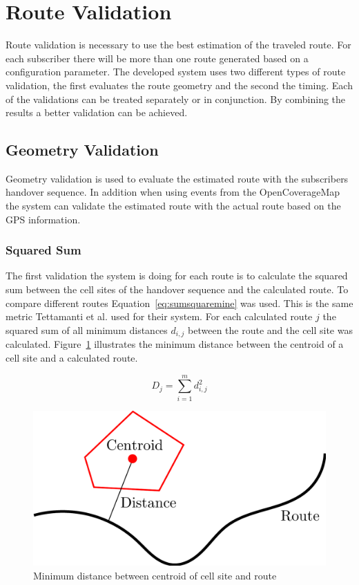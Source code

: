 \section{Route Validation}
\label{sec:routevalidation}
Route validation is necessary to use the best estimation of the traveled route. For each subscriber there will be more than one route generated based on a configuration parameter. The developed system uses two different types of route validation, the first evaluates the route geometry and the second the timing. Each of the validations can be treated separately or in conjunction. By combining the results a better validation can be achieved.
\subsection{Geometry Validation}
Geometry validation is used to evaluate the estimated route with the subscribers handover sequence. In addition when using events from the OpenCoverageMap the system can validate the estimated route with the actual route based on the GPS information.
\subsubsection{Squared Sum}
The first validation the system is doing for each route is to calculate the squared sum between the cell sites of the handover sequence and the calculated route. To compare different routes Equation~\ref{eq:sumsquaremine} was used. This is the same metric Tettamanti et al.\cite{Tettamanti2010} used for their system. For each calculated route $j$ the squared sum of all minimum distances $d_{i,j}$  between the route and the cell site was calculated. Figure~\ref{fig:rms} illustrates the minimum distance between the centroid of a cell site and a calculated route.

\begin{equation}
	\label{eq:sumsquaremine}
	D_j=\sum_{i=1}^{m} d_{i,j}^{2}
\end{equation}
\begin{figure}
	\centering
	\includegraphics[width=0.7\linewidth]{./images/rms}
	\caption{Minimum distance between centroid of cell site and route}
	\label{fig:rms}
\end{figure}


